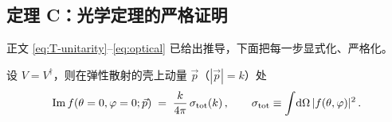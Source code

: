 \subsection{定理 C：光学定理的严格证明}
\label{sec:stat-proof-C}

正文 \eqref{eq:T-unitarity}--\eqref{eq:optical} 已给出推导，下面把每一步显式化、严格化。

\begin{theorem}[光学定理]\label{thm:optical}
设 $V=V^\dagger$，则在弹性散射的壳上动量 $\vec p$（$|\vec p|=k$）处
\begin{equation}
  \Im f(\theta=0,\varphi=0;\vec p) \;=\; \frac{k}{4\pi}\,\sigma_{\rm tot}(k)\,,
  \qquad \sigma_{\rm tot} \equiv \int\!\mathrm{d}\Omega\,|f(\theta,\varphi)|^2\,.
  \label{eq:stat-optical}
\end{equation}
\end{theorem}

